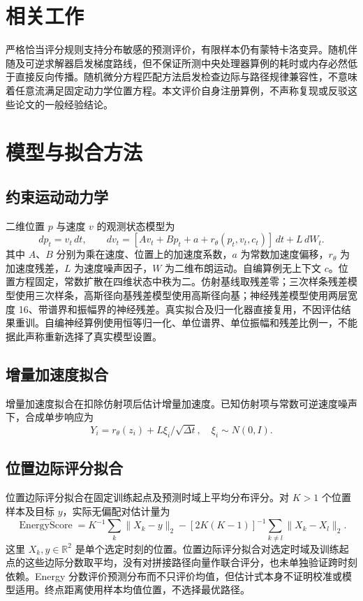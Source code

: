\documentclass[UTF8,11pt]{ctexart}
\begin{document}
\section{相关工作}\label{sec:related}
严格恰当评分规则支持分布敏感的预测评价\cite{gneiting2007}，有限样本仍有蒙特卡洛变异。随机伴随\cite{li2020}及可逆求解器\cite{kidger2021}启发梯度路线，但不保证所测中央处理器算例的耗时或内存必然低于直接反向传播。随机微分方程匹配方法\cite{bartosh2025}启发检查边际与路径规律兼容性，不意味着任意流满足固定动力学位置方程。本文评价自身注册算例，不声称复现或反驳这些论文的一般经验结论。

\section{模型与拟合方法}\label{sec:model}
\subsection{约束运动动力学}
二维位置 $p$ 与速度 $v$ 的观测状态模型为
\begin{equation}\label{eq:model}
 dp_t=v_t\,dt,\qquad dv_t=[A v_t+B p_t+a+r_\theta(p_t,v_t,c_t)]\,dt+L\,dW_t.
\end{equation}
其中 $A$、$B$ 分别为乘在速度、位置上的加速度系数，$a$ 为常数加速度偏移，$r_\theta$ 为加速度残差，$L$ 为速度噪声因子，$W$ 为二维布朗运动。自编算例无上下文 $c$。位置方程固定，常数扩散在四维状态中秩为二。仿射基线取残差零；三次样条残差模型使用三次样条，高斯径向基残差模型使用高斯径向基；神经残差模型使用两层宽度 16、带谱界和振幅界的神经残差。真实拟合及归一化器直接复用，不因评估结果重训。自编神经算例使用恒等归一化、单位谱界、单位振幅和残差比例一，不能据此声称重新选择了真实模型设置。

\subsection{增量加速度拟合}
增量加速度拟合在扣除仿射项后估计增量加速度。已知仿射项与常数可逆速度噪声下，合成单步响应为
\begin{equation}\label{eq:noise}
 Y_i=r_\theta(z_i)+L\xi_i/\sqrt{\Delta t},\quad\xi_i\sim N(0,I).
\end{equation}

\subsection{位置边际评分拟合}
位置边际评分拟合在固定训练起点及预测时域上平均分布评分。对 $K>1$ 个位置样本及目标 $y$，实际无偏配对估计量为
\begin{equation}\label{eq:energy}
 \widehat{\operatorname{EnergyScore}}=K^{-1}\sum_k\|X_k-y\|_2
 -[2K(K-1)]^{-1}\sum_{k\ne l}\|X_k-X_l\|_2.
\end{equation}
这里 $X_k,y\in\mathbb R^2$ 是单个选定时刻的位置。位置边际评分拟合对选定时域及训练起点的这些边际分数取平均，没有对拼接路径向量作联合评分，也未单独验证跨时刻依赖。Energy 分数评价预测分布而不只评价均值\cite{gneiting2007}，但估计式本身不证明校准或模型适用。终点距离使用样本均值位置，不选择最优路径。
\end{document}
